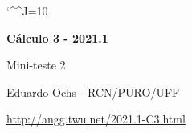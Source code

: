 \documentclass[oneside,12pt]{article}
\begin{document}
\catcode`\^^J=10

\pu

%
%

\def\drafturl{http://angg.twu.net/LATEX/2021-1-C3.pdf}
\def\drafturl{http://angg.twu.net/2021.1-C3.html}
\def\draftfooter{\tiny \href{\drafturl}{\jobname{}} \ColorBrown{\shorttoday{} \hours}}



%

\thispagestyle{empty}

\begin{center}

\vspace*{1.2cm}

{\bf \Large Cálculo 3 - 2021.1}

\bsk

Mini-teste 2

\bsk

Eduardo Ochs - RCN/PURO/UFF

\url{http://angg.twu.net/2021.1-C3.html}

\end{center}
\end{document}
